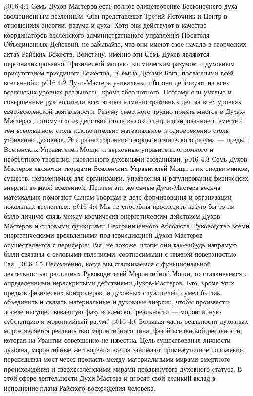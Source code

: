 \vs p016 4:1 Семь Духов\hyp{}Мастеров есть полное олицетворение Бесконечного духа эволюционным вселенным. Они представляют Третий Источник и Центр в отношениях энергии, разума и духа. Хотя они действуют в качестве координаторов вселенского административного управления Носителя Объединенных Действий, не забывайте, что они имеют свое начало в творческих актах Райских Божеств. Воистину, именно эти Семь Духов являются персонализированной физической мощью, космическим разумом и духовным присутствием триединого Божества, «Семью Духами Бога, посланными всей вселенной».
\vs p016 4:2 Духи\hyp{}Мастера уникальны, ибо они действуют на всех вселенских уровнях реальности, кроме абсолютного. Поэтому они умелые и совершенные руководители всех этапов административных дел на всех уровнях сверхвселенской деятельности. Разуму смертного трудно понять многое в Духах\hyp{}Мастерах, потому что их действие столь высоко специализированное и вместе с тем всеохватное, столь исключительно материальное и одновременно столь утонченно духовное. Эти разносторонние творцы космического разума --- предки Вселенских Управителей Мощи, и верховные управители огромного и необъятного творения, населенного духовными созданиями.
\vs p016 4:3 Семь Духов\hyp{}Мастеров являются творцами Вселенских Управителей Мощи и их сподвижников, существ, незаменимых для организации, управления и регулирования физических энергий великой вселенной. Причем эти же самые Духи\hyp{}Мастера весьма материально помогают Сынам\hyp{}Творцам в деле формирования и организации локальных вселенных.
\vs p016 4:4 Мы не способны проследить какую бы то ни было личную связь между космически\hyp{}энергетическим действием Духов\hyp{}Мастеров и силовыми функциями Неограниченного Абсолюта. Руководство всеми энергетическими проявлениями под юрисдикцией Духов\hyp{}Мастеров осуществляется с периферии Рая; не похоже, чтобы они как\hyp{}нибудь напрямую были связаны с силовыми явлениями, соотносимыми с нижней поверхностью Рая.
\vs p016 4:5 Несомненно, когда мы сталкиваемся с функциональной деятельностью различных Руководителей Моронтийной Мощи, то сталкиваемся с определенными нераскрытыми действиями Духов\hyp{}Мастеров. Кто, кроме этих предков физических контролеров, и духовных служителей, сумел бы так объединить и связать материальные и духовные энергии, чтобы произвести доселе несуществовавшую фазу вселенской реальности --- моронтийную субстанцию и моронтийный разум?
\vs p016 4:6 Большая часть реальности духовных миров является реальностью моронтийного чина, фазой вселенской реальности, которая на Урантии совершенно не известна. Цель существования личности духовна, моронтийные же творения всегда занимают промежуточное положение, перекидывая мост через пропасть между материальными мирами смертного происхождения и сверхвселенскими мирами продвинутого духовного статуса. В этой сфере деятельности Духи\hyp{}Мастера и вносят свой великий вклад в исполнение плана Райского восхождения человека.
